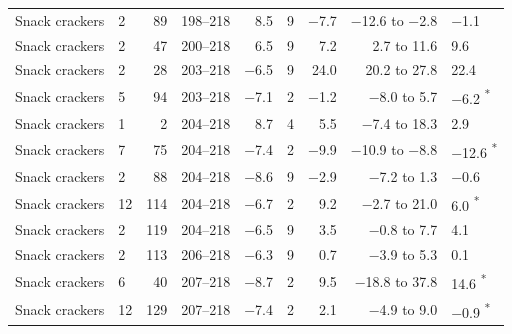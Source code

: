 \begin{tabular}{@{}llrrrrrrl@{}}
Snack crackers & 2 & 89 & 198--218 & 8.5 & 9 & −7.7 & −12.6 to −2.8 & −1.1 \\
Snack crackers & 2 & 47 & 200--218 & 6.5 & 9 & 7.2 & 2.7 to 11.6 & 9.6 \\
Snack crackers & 2 & 28 & 203--218 & −6.5 & 9 & 24.0 & 20.2 to 27.8 & 22.4 \\
Snack crackers & 5 & 94 & 203--218 & −7.1 & 2 & −1.2 & −8.0 to 5.7 & −6.2 \textsuperscript{*} \\
Snack crackers & 1 & 2 & 204--218 & 8.7 & 4 & 5.5 & −7.4 to 18.3 & 2.9 \\
Snack crackers & 7 & 75 & 204--218 & −7.4 & 2 & −9.9 & −10.9 to −8.8 & −12.6 \textsuperscript{*} \\
Snack crackers & 2 & 88 & 204--218 & −8.6 & 9 & −2.9 & −7.2 to 1.3 & −0.6 \\
Snack crackers & 12 & 114 & 204--218 & −6.7 & 2 & 9.2 & −2.7 to 21.0 & 6.0 \textsuperscript{*} \\
Snack crackers & 2 & 119 & 204--218 & −6.5 & 9 & 3.5 & −0.8 to 7.7 & 4.1 \\
Snack crackers & 2 & 113 & 206--218 & −6.3 & 9 & 0.7 & −3.9 to 5.3 & 0.1 \\
Snack crackers & 6 & 40 & 207--218 & −8.7 & 2 & 9.5 & −18.8 to 37.8 & 14.6 \textsuperscript{*} \\
Snack crackers & 12 & 129 & 207--218 & −7.4 & 2 & 2.1 & −4.9 to 9.0 & −0.9 \textsuperscript{*} \\
\bottomrule
\end{tabular}
